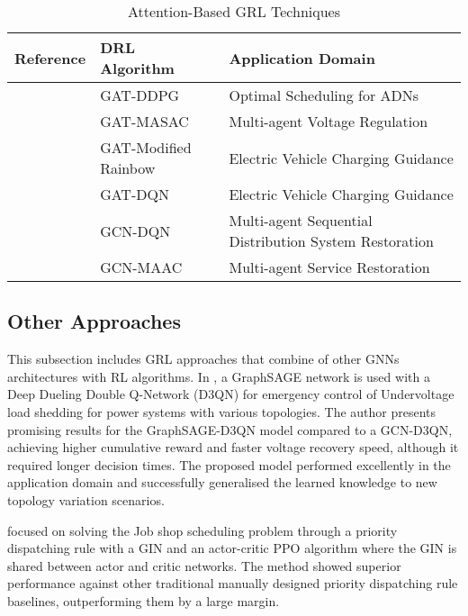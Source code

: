 \begin{table}[h!]
	\centering
	\caption{Attention-Based GRL Techniques}
	\begin{tabular}{|P{2cm}|P{4cm}|p{6cm}|  }
		\hline
		\textbf{Reference} & \textbf{DRL Algorithm} & \textbf{Application Domain} \\
		\hline
		\cite{xingRealtimeOptimalScheduling2023} & GAT-DDPG & Optimal Scheduling for ADNs  \\ \hline
		\cite{chenPhysicalassistedMultiagentGraph2023}  &  GAT-MASAC  & Multi-agent Voltage Regulation \\ \hline 
		\cite{xingBilevelGraphReinforcement2023} & GAT-Modified Rainbow & Electric Vehicle Charging Guidance \\ \hline
		\cite{xuRealtimeFastCharging2022} & GAT-DQN & Electric Vehicle Charging Guidance \\ \hline 
		\cite{zhaoLearningSequentialDistribution2022} & GCN-DQN & Multi-agent Sequential Distribution System Restoration \\ \hline
		\cite{fanAttentionBasedMultiAgentGraph2023} & GCN-MAAC & Multi-agent Service Restoration \\ \hline
	\end{tabular}
\end{table}


\subsection{Other Approaches}

This subsection includes \ac{GRL} approaches that combine of other \acp{GNN} architectures with \ac{RL} algorithms. In \cite{peiEmergencyControlStrategy2023}, a GraphSAGE network is used with a Deep Dueling Double Q-Network (D3QN) for emergency control of Undervoltage load shedding for power systems with various topologies. The author presents promising results for the GraphSAGE-D3QN model compared to a GCN-D3QN, achieving higher cumulative reward and faster voltage recovery speed, although it required longer decision times. The proposed model performed excellently in the application domain and successfully generalised the learned knowledge to new topology variation scenarios. \par
	\cite{zhangLearningDispatchJob2020} focused on solving the Job shop scheduling problem through a priority dispatching rule with a \ac{GIN} \cite{xuHowPowerfulAre2019} and an actor-critic \ac{PPO} algorithm where the \ac{GIN} is shared between actor and critic networks. The method showed superior performance against other traditional manually designed priority dispatching rule baselines, outperforming them by a large margin.


